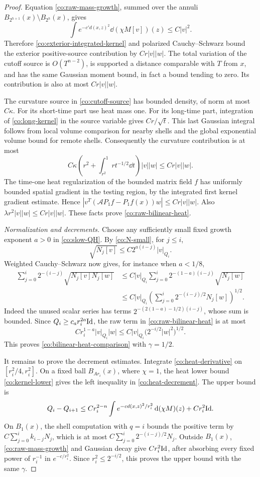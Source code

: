 \begin{proof}
Equation \eqref{co:raw-mass-growth}, summed over the annuli
\(B_{2^{h+1}}(x)\setminus B_{2^h}(x)\), gives
\[
 \int e^{-c'd(x,z)^2}\dd(\chi M[v])(z)\le C|v|^2.
\]
Therefore \eqref{co:exterior-integrated-kernel} and polarized
Cauchy--Schwarz bound the exterior positive-source contribution
by \(Cr|v||w|\).  The total variation of the cutoff source is
\(O(T^{n-2})\), is supported a distance comparable with \(T\)
from \(x\), and has the same Gaussian moment bound, in fact a
bound tending to zero.  Its contribution is also at most
\(Cr|v||w|\).

The curvature source in \eqref{co:cutoff-source} has bounded
density, of norm at most \(C\kappa\).  For its short-time part use
heat mass one.  For its long-time part, integration of
\eqref{co:long-kernel} in the source variable gives
\(Cr/\sqrt t\).  This last Gaussian integral follows from local
volume comparison for nearby shells and the global exponential
volume bound for remote shells.  Consequently the curvature
contribution is at most
\[
 C\kappa\left(r^2+\int_{r^2}^1 r t^{-1/2}\dd t\right)|v||w|
 \le Cr|v||w|.
\]
The time-one heat regularization of the bounded matrix field
\(f\) has uniformly bounded spatial gradient in the testing
region, by the integrated first kernel gradient estimate.
Hence \(|v^T(\mathcal A P_1f-P_1f(x))w|\le Cr|v||w|\).
Also \(\lambda r^2|v||w|\le Cr|v||w|\).  These facts prove
\eqref{co:raw-bilinear-heat}.

\smallskip\noindent
\emph{Normalization and decrements.}
Choose any sufficiently small fixed growth exponent \(a>0\) in
\eqref{co:slow-QH}.  By \eqref{co:N-small}, for \(j\le i\),
\[
 \sqrt{N_j[v]}\le C2^{a(i-j)}|v|_{Q_i}.
\]
Weighted Cauchy--Schwarz now gives, for instance when \(a<1/8\),
\begin{align*}
 \sum_{j=0}^i2^{-(i-j)}\sqrt{N_j[v]N_j[w]}
 &\le C|v|_{Q_i}\sum_{j=0}^i2^{-(1-a)(i-j)}\sqrt{N_j[w]}\\
 &\le C|v|_{Q_i}
       \left(\sum_{j=0}^i2^{-(i-j)/2}N_j[w]\right)^{1/2}.
\end{align*}
Indeed the unused scalar series has terms
\(2^{-(2(1-a)-1/2)(i-j)}\), whose sum is bounded.  Since
\(Q_i\ge c_a r_i^{2a}\mathrm{Id}\), the raw term in
\eqref{co:raw-bilinear-heat} is at most
\[
 Cr_i^{1-a}|v|_{Q_i}|w|
 \le C|v|_{Q_i}\bigl(2^{-i/2}|w|^2\bigr)^{1/2}.
\]
This proves \eqref{co:bilinear-heat-comparison} with
\(\gamma=1/2\).

It remains to prove the decrement estimates.  Integrate
\eqref{co:heat-derivative} on
\([r_i^2/4,r_i^2]\).  On a fixed ball \(B_{Ar_i}(x)\), where
\(\chi=1\), the heat lower bound
\eqref{co:kernel-lower} gives the left inequality in
\eqref{co:heat-decrement}.  The upper bound is
\[
 Q_i-Q_{i+1}
 \le Cr_i^{2-n}\int e^{-c d(x,z)^2/r_i^2}\,\mathrm d(\chi M)(z)
        +Cr_i^2\mathrm{Id}.
\]
On \(B_1(x)\), the shell computation with \(q=i\) bounds the
positive term by \(C\sum_{j=0}^i k_{i-j}N_j\), which is at most
\(C\sum_{j=0}^i2^{-(i-j)/2}N_j\).  Outside \(B_1(x)\),
\eqref{co:raw-mass-growth} and Gaussian decay give \(Cr_i^2\mathrm{Id}\),
after absorbing every fixed power of \(r_i^{-1}\) in
\(e^{-c/r_i^2}\).  Since \(r_i^2\le2^{-i/2}\), this proves the
upper bound with the same \(\gamma\).
\end{proof}

